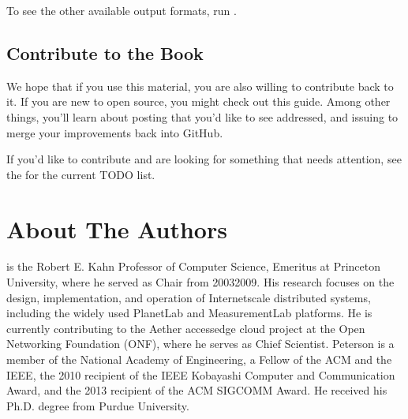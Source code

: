 \documentclass[a4paper,11pt,english]{sphinxmanual}
\begin{document}
\sphinxAtStartPar
To see the other available output formats, run .


\section{Contribute to the Book}
\label{\detokenize{README:contribute-to-the-book}}
\sphinxAtStartPar
We hope that if you use this material, you are also willing to
contribute back to it. If you are new to open source, you might check
out this  guide. Among
other things, you’ll learn about posting  that you’d like to see
addressed, and issuing  to merge your improvements back
into GitHub.

\sphinxAtStartPar
If you’d like to contribute and are looking for something that needs
attention, see the 
for the current TODO list.


\chapter{About The Authors}
\label{\detokenize{authors:about-the-authors}}\label{\detokenize{authors::doc}}
\sphinxAtStartPar
{} is the Robert E. Kahn Professor of Computer
Science, Emeritus at Princeton University, where he served as Chair
from 2003\sphinxhyphen{}2009. His research focuses on the design, implementation,
and operation of Internet\sphinxhyphen{}scale distributed systems, including the
widely used PlanetLab and MeasurementLab platforms.  He is currently
contributing to the Aether access\sphinxhyphen{}edge cloud project at the Open
Networking Foundation (ONF), where he serves as Chief Scientist.
Peterson is a member of the National Academy of Engineering, a Fellow
of the ACM and the IEEE, the 2010 recipient of the IEEE Kobayashi
Computer and Communication Award, and the 2013 recipient of the ACM
SIGCOMM Award. He received his Ph.D. degree from Purdue University.
\end{document}
